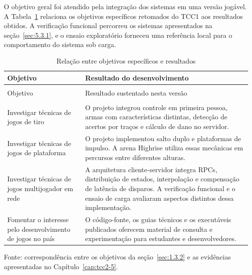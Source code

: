 O objetivo geral foi atendido pela integração dos sistemas em uma versão jogável. A Tabela~\ref{tab:tcc2-7} relaciona os objetivos específicos retomados do TCC1 aos resultados obtidos. A verificação funcional percorreu os sistemas apresentados na seção~\ref{sec:5.3.1}, e o ensaio exploratório forneceu uma referência local para o comportamento do sistema sob carga.

\begingroup
\small
\setlength{\tabcolsep}{4pt}
\renewcommand{\arraystretch}{1.18}
\begin{longtable}{>{\raggedright\arraybackslash}p{}>{\raggedright\arraybackslash}p{}}
\caption{Relação entre objetivos específicos e resultados}\label{tab:tcc2-7}\\
\toprule
Objetivo & Resultado do desenvolvimento \\
\midrule
\endfirsthead
\multicolumn{2}{l}{\small Relação entre objetivos específicos e resultados (continuação)}\\
\toprule
Objetivo & Resultado sustentado nesta versão \\
\midrule
\endhead
\midrule
\multicolumn{2}{r}{\small Continua na próxima página.}\\
\endfoot
\bottomrule
\endlastfoot
Investigar técnicas de jogos de tiro & O projeto integrou controle em primeira pessoa, armas com características distintas, detecção de acertos por traços e cálculo de dano no servidor. \\
Investigar técnicas de jogos de plataforma & O projeto implementou salto duplo e plataformas de impulso. A arena Highrise utiliza essas mecânicas em percursos entre diferentes alturas. \\
Investigar técnicas de jogos multijogador em rede & A arquitetura cliente-servidor integra RPCs, distribuição de estados, interpolação e compensação de latência de disparos. A verificação funcional e o ensaio de carga avaliaram aspectos distintos dessa implementação. \\
Fomentar o interesse pelo desenvolvimento de jogos no país & O código-fonte, os guias técnicos e os executáveis publicados oferecem material de consulta e experimentação para estudantes e desenvolvedores. \\
\end{longtable}
\endgroup

Fonte: correspondência entre os objetivos da seção~\ref{sec:1.3.2} e as evidências apresentadas no Capítulo~\ref{cap:tcc2-5}.

